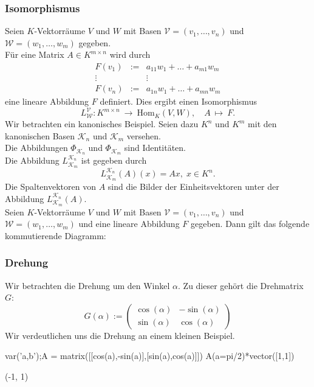 \documentclass[fontsize=12pt,paper=a4,twoside,bibtotoc,idxtotoc,
liststotoc,pagesize,BCOR1.2cm,DIV15,chapterprefix,pagesize=pdftex]{scrbook}
\theoremstyle{plain}
\theoremstyle{definition}
\theoremstyle{remark}
\begin{document}
\subsubsection{Isomorphismus}
Seien $K$-Vektorräume $V$ und $W$ mit Basen $\mathcal{V}=(v_1, \dots
,v_n)$ und $\mathcal{W}=(w_1, \dots ,w_m)$ gegeben.\\
Für eine Matrix $A\in K^{m \times n}$ wird durch
\begin{eqnarray*}
F(v_1) & := & a_{11}w_1 + \dots +a_{m1} w_m\\
\vdots &    & \vdots     \\
F(v_n) & := & a_{1n} w_1 + \dots + a_{mn}w_m
\end{eqnarray*}
eine lineare Abbildung $F$ definiert. Dies ergibt einen Isomorphismus
\[
L^\mathcal{V}_\mathcal{W}: K^{m \times n} \ \rightarrow \
\mathrm{Hom}_K(V,W), \quad A \ \mapsto \ F.
\] 
Wir betrachten ein kanonisches Beispiel. Seien dazu $K^n$ und $K^m$ mit den kanonischen Basen $\mathcal{K}_n$ und
$\mathcal{K}_m$ versehen.\\
Die Abbildungen $\Phi_{\mathcal{K}_n}$ und $\Phi_{\mathcal{K}_m}$
sind Identitäten.\\
Die Abbildung $L^{\mathcal{K}_n}_{\mathcal{K}_m}$ ist gegeben
durch 
\[ L^{\mathcal{K}_n}_{\mathcal{K}_m} (A)(x)=Ax,\; x \in K^n. \]
Die Spaltenvektoren von $A$ sind die Bilder der Einheitsvektoren
unter der Abbildung  $L^{\mathcal{K}_n}_{\mathcal{K}_m}(A)$.\\
Seien $K$-Vektorräume $V$ und $W$ mit Basen $\mathcal{V}=(v_1, \dots
,v_n)$ und $\mathcal{W}=(w_1, \dots ,w_m)$ und eine lineare Abbildung
$F$ gegeben. Dann gilt das folgende kommutierende Diagramm:
\begin{center}
\end{center}
\subsubsection{Drehung}
Wir betrachten die Drehung um den Winkel $\alpha$. Zu dieser gehört die Drehmatrix $G$:
\[ G(\alpha):= \left ( \begin{array}{cc}
\cos(\alpha) & -\sin(\alpha) \\
\sin(\alpha) & \cos(\alpha)
\end{array} \right)
\]
Wir verdeutlichen uns die Drehung an einem kleinen Beispiel.
\begin{sagein}
var('a,b');A = matrix([[cos(a),-sin(a)],[sin(a),cos(a)]])
A(a=pi/2)*vector([1,1])
\end{sagein}
\begin{sageout}
 (-1, 1)
\end{sageout}
\end{document}
